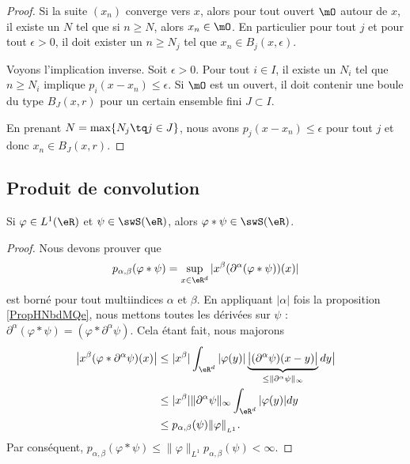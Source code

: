 \begin{proof}
    Si la suite \( (x_n)\) converge vers \( x\), alors pour tout ouvert \( \mO\) autour de \( x\), il existe un \( N\) tel que si \( n\geq N\), alors \( x_n\in\mO\). En particulier pour tout \( j\) et pour tout \( \epsilon>0\), il doit exister un \( n\geq N_j\) tel que \( x_n\in B_j(x,\epsilon)\).

    Voyons l'implication inverse. Soit \( \epsilon>0\). Pour tout \( i\in I\), il existe un \( N_i\) tel que \( n\geq N_i\) implique \( p_i(x-x_n)\leq \epsilon\). Si \( \mO\) est un ouvert, il doit contenir une boule du type \( B_J(x,r)\) pour un certain ensemble fini \( J\subset I\).

    En prenant \( N=\max\{ N_j\tq j\in J \}\), nous avons \( p_j(x-x_n)\leq \epsilon\) pour tout \( j\) et donc \( x_n\in B_J(x,r)\).
\end{proof}

\subsection{Produit de convolution}

\begin{proposition}
    Si \( \varphi\in L^1(\eR)\) et \( \psi\in\swS(\eR)\), alors \( \varphi * \psi\in \swS(\eR)\).
\end{proposition}

\begin{proof}
    Nous devons prouver que
    \begin{equation}
        p_{\alpha,\beta}(\varphi*\psi)=\sup_{x\in \eR^d}| x^{\beta}(\partial^{\alpha}(\varphi*\psi))(x) |
    \end{equation}
    est borné pour tout multiindices \( \alpha\) et \( \beta\). En appliquant \( | \alpha |\) fois la proposition \ref{PropHNbdMQe}, nous mettons toutes les dérivées sur \( \psi\) : \( \partial^{\alpha}(\varphi*\psi)=(\varphi*\partial^{\alpha}\psi)\). Cela étant fait, nous majorons
    \begin{subequations}
        \begin{align}
            \big| x^{\beta}(\varphi*\partial^{\alpha}\psi)(x) \big|&\leq| x^{\beta} |\int_{\eR^d} |\varphi(y)|\underbrace{\big| (\partial^{\alpha}\psi)(x-y)\big|}_{\leq\| \partial^{\alpha}\psi \|_{\infty}} dy \big|\\
            &\leq | x^{\beta} |  \| \partial^{\alpha}\psi \|_{\infty}\int_{\eR^d}| \varphi(y) |dy\\
            &\leq p_{\alpha,\beta}(\psi)\| \varphi \|_{_{L^1}}.
        \end{align}
    \end{subequations}
    Par conséquent, \( p_{\alpha,\beta}(\varphi*\psi)\leq \| \varphi \|_{L^1}p_{\alpha,\beta}(\psi)<\infty\).
\end{proof}

